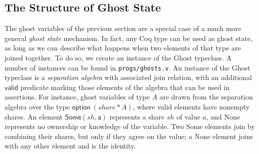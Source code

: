 \documentclass[11pt]{article} %
\begin{document}
\subsection{The Structure of Ghost State}
The ghost variables of the previous section are a special case of a much more general \emph{ghost state} mechanism. In fact, any Coq type can be used as ghost state, as long as we can describe what happens when two elements of that type are joined together. To do so, we create an instance of the \textsf{Ghost} typeclass. A number of instances can be found in \texttt{progs/ghosts.v}. An instance of the \textsf{Ghost} typeclass is a \emph{separation algebra} with associated \textsf{join} relation, with an additional $\mathsf{valid}$ predicate marking those elements of the algebra that can be used in assertions. For instance, ghost variables of type $A$ are drawn from the separation algebra over the type $\mathsf{option}\ (share * A)$, where valid elements have nonempty shares. An element $\mathsf{Some (\mathit{sh}, a)}$ represents a share $\mathit{sh}$ of value $a$, and \textsf{None} represents no ownership or knowledge of the variable. Two \textsf{Some} elements join by combining their shares, but only if they agree on the value; a \textsf{None} element joins with any other element and is the identity.
\end{document}

